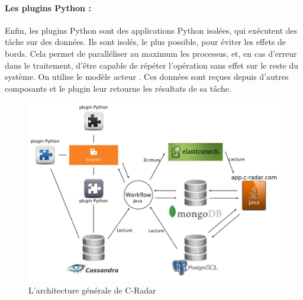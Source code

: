             \paragraph{Les plugins Python :}
                Enfin, les plugins Python sont des applications Python isolées, qui exécutent des tâche sur des données. Ils sont isolés, le plus possible, pour éviter les effets de bords. Cela permet de paralléliser au maximum les processus, et, en cas d'erreur dans le traitement, d'être capable de répéter l'opération sans effet sur le reste du système. On utilise le modèle acteur\autocite{modele_acteur} . Ces données sont reçues depuis d'autres composants et le plugin leur retourne les résultats de sa tâche.

            \begin{figure}[h!]
                \centering
                \includegraphics[width=\textwidth]{images/archi.jpg}
                \caption{L'architecture générale de C-Radar}
                \label{fig:archi}
            \end{figure}